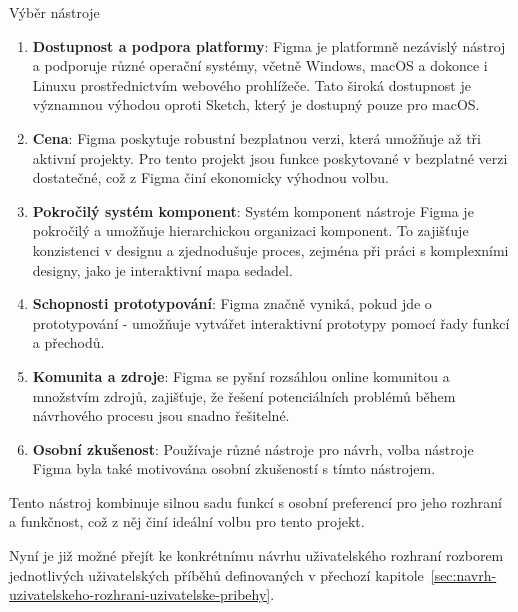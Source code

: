 \begin{subsection}{Výběr nástroje}
    \begin{enumerate}
        \item \textbf{Dostupnost a podpora platformy}: Figma je platformně nezávislý nástroj a podporuje různé operační systémy, včetně Windows, macOS a dokonce i Linuxu prostřednictvím webového prohlížeče.
        Tato široká dostupnost je významnou výhodou oproti Sketch, který je dostupný pouze pro macOS\@.
        \item \textbf{Cena}: Figma poskytuje robustní bezplatnou verzi, která umožňuje až tři aktivní projekty.
        Pro tento projekt jsou funkce poskytované v bezplatné verzi dostatečné, což z Figma činí ekonomicky výhodnou volbu.
        \item \textbf{Pokročilý systém komponent}: Systém komponent nástroje Figma je pokročilý a umožňuje hierarchickou organizaci komponent.
        To zajišťuje konzistenci v designu a zjednodušuje proces, zejména při práci s komplexními designy, jako je interaktivní mapa sedadel.
        \item \textbf{Schopnosti prototypování}: Figma značně vyniká, pokud jde o prototypování - umožňuje vytvářet interaktivní prototypy pomocí řady funkcí a přechodů.
        \item \textbf{Komunita a zdroje}: Figma se pyšní rozsáhlou online komunitou a množstvím zdrojů, zajišťuje, že řešení potenciálních problémů během návrhového procesu jsou snadno řešitelné.
        \item \textbf{Osobní zkušenost}: Používaje různé nástroje pro návrh, volba nástroje Figma byla také motivována osobní zkušeností s tímto nástrojem.
    \end{enumerate}

    Tento nástroj kombinuje silnou sadu funkcí s osobní preferencí pro jeho rozhraní a funkčnost, což z něj činí ideální volbu pro tento projekt.

    Nyní je již možné přejít ke konkrétnímu návrhu uživatelského rozhraní rozborem jednotlivých uživatelských příběhů definovaných v přechozí kapitole~\ref{sec:navrh-uzivatelskeho-rozhrani-uzivatelske-pribehy}.
\end{subsection}

